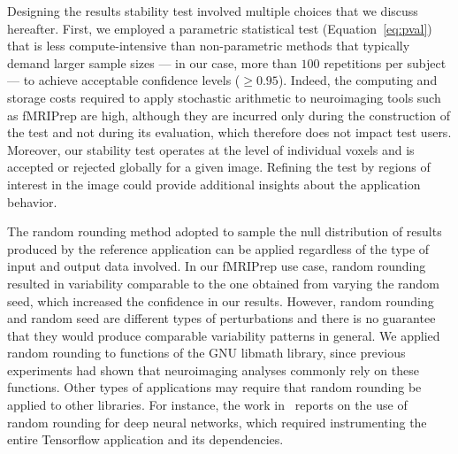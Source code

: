 \documentclass[lettersize,journal]{IEEEtran}
\newcommand{\fmriprep}{fMRIPrep\xspace}
\begin{document}
Designing the results stability test involved multiple choices that we discuss hereafter.
First, we employed a parametric statistical test (Equation~\ref{eq:pval}) that is less compute-intensive than non-parametric methods that typically demand larger sample sizes --- in our case, more than $100$ repetitions per subject --- to achieve acceptable confidence levels ($\geq 0.95$).
Indeed, the computing and storage costs required to apply stochastic arithmetic to neuroimaging tools such as \fmriprep are high, although they are incurred only during the construction of the test 
and not during its evaluation, which therefore does not impact test users. Moreover, our stability test operates at the level of individual voxels and is accepted or rejected globally for a given image. Refining the test by regions of interest in the image could provide additional insights about the application behavior.

The random rounding method adopted to sample the null distribution of results produced by the reference application can be applied regardless of the type of input and output data involved. In our \fmriprep use case, random rounding resulted in variability comparable to the one obtained from varying the random seed, which increased the confidence in our results. However, random rounding and random seed are different types of perturbations and there is no guarantee that they would produce comparable variability patterns in general. We applied random rounding to functions of the GNU libmath library, since previous experiments had shown that neuroimaging analyses commonly rely on these functions. Other types of applications may require that random rounding be applied to other libraries. For instance, the work in~\cite{pepe2022numerical} reports on the use of random rounding for deep neural networks, which required instrumenting the entire Tensorflow application and its dependencies.
\end{document}
